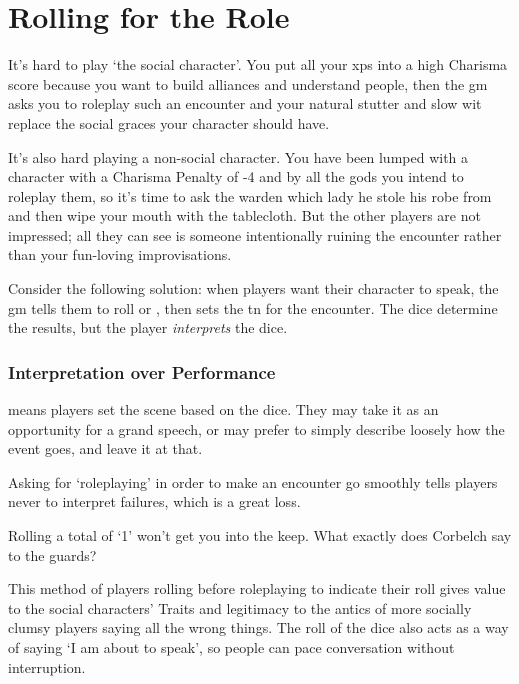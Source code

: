 \section{Rolling for the Role}
\label{rollForRoles}

\begin{multicols}{2}

\noindent
It's hard to play `the social character'.
You put all your \glspl{xp} into a high Charisma score because you want to build alliances and understand people, then the \gls{gm} asks you to roleplay such an encounter and your natural stutter and slow wit replace the social graces your character should have.

It's also hard playing a non-social character.
You have been lumped with a character with a Charisma Penalty of -4 and by all the gods you intend to roleplay them, so it's time to ask the \gls{warden} which lady he stole his robe from and then wipe your mouth with the tablecloth.
But the other players are not impressed; all they can see is someone intentionally ruining the encounter rather than your fun-loving improvisations.

Consider the following solution: when players want their character to speak, the \gls{gm} tells them to roll  or , then sets the \gls{tn} for the encounter.
The dice determine the results, but the player \emph{interprets} the dice.

\subsubsection{Interpretation over Performance}
means players set the scene based on the dice.
They may take it as an opportunity for a grand speech, or may prefer to simply describe loosely how the event goes, and leave it at that.

Asking for `roleplaying' in order to make an encounter go smoothly tells players never to interpret failures, which is a great loss.

\begin{speechtext}
  Rolling a total of `1' won't get you into the keep.
  What exactly does Corbelch say to the guards?
\end{speechtext}
This method of players rolling before roleplaying to indicate their roll gives value to the social characters' Traits and legitimacy to the antics of more socially clumsy players saying all the wrong things.
The roll of the dice also acts as a way of saying `I am about to speak', so people can pace conversation without interruption.

\end{multicols}

